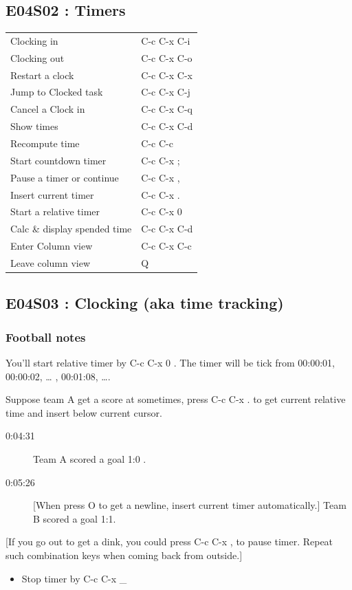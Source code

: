 \documentclass[11pt]{article}
\begin{document}
\subsection{E04S02 : Timers}
\label{sec:org6aa86a4}
\begin{center}
\begin{tabular}{ll}
\hline
Clocking in &  C-c C-x C-i \\
Clocking out &  C-c C-x C-o \\
Restart a clock &  C-c C-x C-x \\
Jump to Clocked task &  C-c C-x C-j \\
Cancel a Clock in &  C-c C-x C-q \\
Show times &  C-c C-x C-d \\
Recompute time &  C-c C-c \\
Start countdown timer &  C-c C-x ; \\
Pause a timer or continue &  C-c C-x , \\
Insert current timer &  C-c C-x . \\
Start a relative timer &  C-c C-x 0 \\
Calc \& display spended time &  C-c C-x C-d \\
Enter Column view &  C-c C-x C-c \\
Leave column view &  Q \\
\hline
\end{tabular}
\end{center}

\subsection{E04S03 : Clocking (aka time tracking)}
\label{sec:org4f30f51}
\subsubsection{Football notes}
\label{sec:org5e88979}

You'll start relative timer by  C-c C-x 0 
. The timer will be tick from 00:00:01, 00:00:02, \ldots{} , 00:01:08, \ldots{}.

Suppose team A get a score at sometimes, press  C-c C-x .
 to get current relative time and insert below current
cursor.

\begin{description}
\item[{0:04:31}] Team A scored a goal 1:0 .
\item[{0:05:26}] [When press  O  to get a
newline, insert current timer automatically.] Team B scored
a goal 1:1.
\end{description}
[If you go out to get a dink, you could press  C-c C-x ,  
 to pause timer. Repeat such combination keys when coming back from outside.]
\begin{itemize}
\item Stop timer by  C-c C-x \_
\end{itemize}
\end{document}
